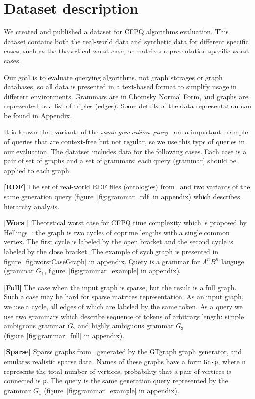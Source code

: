 \section{Dataset description}

We created and published a dataset for CFPQ algorithms evaluation.
This dataset contains both the real-world data and synthetic data for different specific cases, such as the theoretical worst case, or matrices representation specific worst cases.

Our goal is to evaluate querying algorithms, not graph storages or graph databases, so all data is presented in a text-based format to simplify usage in different environments.
Grammars are in Chomsky Normal Form, and graphs are represented as a list of triples (edges).
Some details of the data representation  can be found in Appendix.

It is known that variants of the \textit{same generation query}~\cite{FndDB} are a important example of queries that are context-free but not regular, so we use this type of queries in our evaluation.
The datatset includes data for the following cases.
Each case is a pair of set of graphs and a set of grammars: each query (grammar) should be applied to each graph.

\textbf{[RDF]} The set of real-world RDF files (ontologies) from~\cite{RDF} and two variants of the same generation query (figure~\ref{fig:grammar_rdf} in appendix) which describes hierarchy analysis.

\textbf{[Worst]} Theoretical worst case for CFPQ time complexity which is proposed by Hellings~\cite{hellingsPathQuerying}: the graph is two cycles of coprime lengths with a single common vertex.
The first cycle is labeled by the open bracket and the second cycle is labeled by the close bracket.
The example of sych graph is presented in figure~\ref{fig:worstCaseGraph} in appendix.
Query is a grammar for $A^nB^n$ languge (grammar $G_1$, figure~\ref{fig:grammar_example} in appendix).

\textbf{[Full]} The case when the input graph is sparse, but the result is a full graph.
Such a case may be hard for sparse matrices representation.
As an input graph, we use a cycle, all edges of which are labeled by the same token.
As a query we use two grammars which describe sequence of tokens of arbitrary length: simple ambiguous grammar $G_2$  and highly ambiguous grammar $G_3$ (figure~\ref{fig:grammar_full} in appendix).

\textbf{[Sparse]} Sparse graphs from~\cite{fan2018scaling} generated by the GTgraph graph generator, and emulates realistic sparse data.
Names of these graphs have a form \texttt{Gn-p}, where \texttt{n} represents the total number of vertices, probability that a pair of vertices is connected is \texttt{p}.
The query is the same generation query represented by the grammar $G_1$ (figure~\ref{fig:grammar_example} in appendix).
